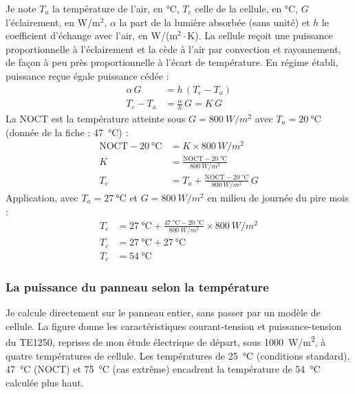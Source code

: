 \begin{demonstration}
Je note $T_a$ la température de l'air, en °C, $T_c$ celle de la cellule, en °C, $G$ l'éclairement, en W/m$^2$, $\alpha$ la part de la lumière absorbée (sans unité) et $h$ le coefficient d'échange avec l'air, en W/(m$^2\cdot$K). La cellule reçoit une puissance proportionnelle à l'éclairement et la cède à l'air par convection et rayonnement, de façon à peu près proportionnelle à l'écart de température. En régime établi, puissance reçue égale puissance cédée :
\begin{align*}
\alpha\, G &= h\,(T_c - T_a)\\
T_c - T_a &= \frac{\alpha}{h}\, G = K\, G
\end{align*}
La NOCT est la température atteinte sous $G = \qty{800}{W/m^2}$ avec $T_a = \qty{20}{\celsius}$ (donnée de la fiche : \qty{47}{\celsius}) :
\begin{align*}
\mathrm{NOCT} - \qty{20}{\celsius} &= K \times \qty{800}{W/m^2}\\
K &= \frac{\mathrm{NOCT} - \qty{20}{\celsius}}{\qty{800}{W/m^2}}\\
T_c &= T_a + \frac{\mathrm{NOCT} - \qty{20}{\celsius}}{\qty{800}{W/m^2}}\, G
\end{align*}
Application, avec $T_a = \qty{27}{\celsius}$ et $G = \qty{800}{W/m^2}$ en milieu de journée du pire mois :
\begin{align*}
T_c &= \qty{27}{\celsius} + \frac{\qty{47}{\celsius} - \qty{20}{\celsius}}{\qty{800}{W/m^2}} \times \qty{800}{W/m^2}\\
T_c &= \qty{27}{\celsius} + \qty{27}{\celsius}\\
T_c &= \qty{54}{\celsius}
\end{align*}
\end{demonstration}

\subsubsection*{La puissance du panneau selon la température}

Je calcule directement sur le panneau entier, sans passer par un modèle de cellule. La figure donne les caractéristiques courant-tension et puissance-tension du TE1250, reprises de mon étude électrique de départ, sous \qty{1000}{W/m^2}, à quatre températures de cellule. Les températures de \qty{25}{\celsius} (conditions standard), \qty{47}{\celsius} (NOCT) et \qty{75}{\celsius} (cas extrême) encadrent la température de \qty{54}{\celsius} calculée plus haut.

